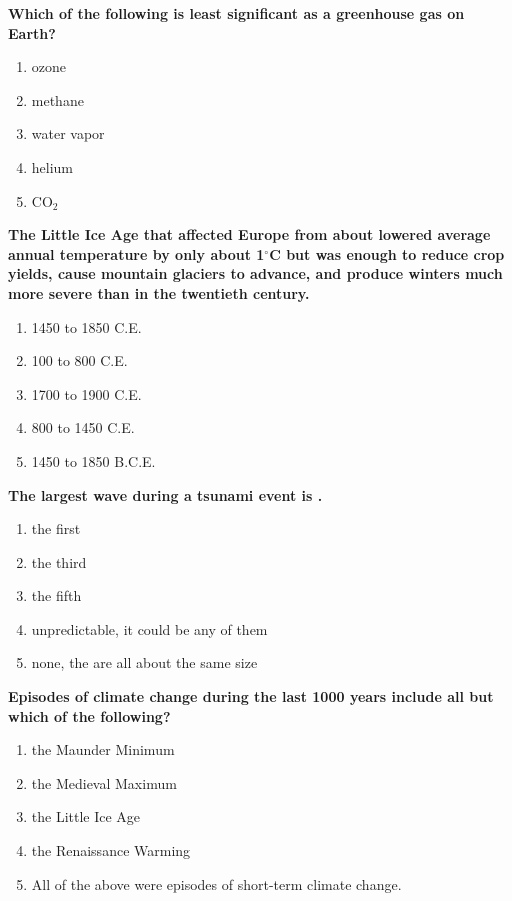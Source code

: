 \item {
\setlength{\itemsep}{0cm}
\setlength{\parskip}{.2cm}
\begin{samepage}
\textbf{
Which of the following is least significant as a greenhouse gas on Earth?
}
\begin{enumerate}
\item {  ozone }
\item {  methane }
\item {  water vapor }
\item {  helium }
\item {  CO\ensuremath{_2} }
\end{enumerate}
\end{samepage}
}
\item {
\setlength{\itemsep}{0cm}
\setlength{\parskip}{.2cm}
\begin{samepage}
\textbf{
The Little Ice Age that affected Europe from about \makebox[1cm]{\Rivpt\hrulefill\Rivpt} lowered average annual temperature by only about 1\ensuremath{^\circ}C but was enough to reduce crop yields, cause mountain glaciers to advance, and produce winters much more severe than in the twentieth century.
}
\begin{enumerate}
\item {  1450 to 1850 C.E. }
\item {  100 to 800 C.E. }
\item {  1700 to 1900 C.E. }
\item {  800 to 1450 C.E. }
\item {  1450 to 1850 B.C.E. }
\end{enumerate}
\end{samepage}
}
\item {
\setlength{\itemsep}{0cm}
\setlength{\parskip}{.2cm}
\begin{samepage}
\textbf{
The largest wave during a tsunami event is \makebox[1cm]{\Rivpt\hrulefill\Rivpt}.
}
\begin{enumerate}
\item { 	the first }
\item { 	the third }
\item { 	the fifth }
\item { 	unpredictable, it could be any of them }
\item { 	none, the are all about the same size 		 }
\end{enumerate}
\end{samepage}
}
\item {
\setlength{\itemsep}{0cm}
\setlength{\parskip}{.2cm}
\begin{samepage}
\textbf{
Episodes of climate change during the last 1000 years include all but which of the following?
}
\begin{enumerate}
\item {  the Maunder Minimum }
\item {  the Medieval Maximum }
\item {  the Little Ice Age }
\item {  the Renaissance Warming }
\item {  All of the above were episodes of short-term climate change. }
\end{enumerate}
\end{samepage}
}
